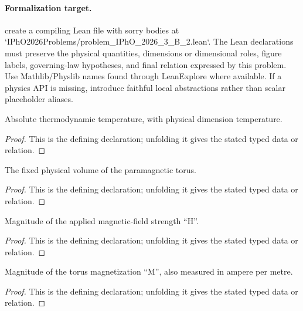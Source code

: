 \paragraph{Formalization target.}
create a compiling Lean file with sorry bodies at `IPhO2026Problems/problem\_IPhO\_2026\_3\_B\_2.lean`. The Lean declarations must preserve the physical quantities, dimensions or dimensional roles, figure labels, governing-law hypotheses, and final relation expressed by this problem.
Use Mathlib/Physlib names found through LeanExplore where available. If a physics API is missing, introduce faithful local abstractions rather than scalar placeholder aliases.

\begin{definition}[ThermodynamicTemperature]
  \label{decl:physics:IPhO_2026_3_B_2:ThermodynamicTemperature}
  Absolute thermodynamic temperature, with physical dimension temperature.
\end{definition}
\begin{proof}
  This is the defining declaration; unfolding it gives the stated typed data or relation.
\end{proof}

\begin{definition}[PhysicalVolume]
  \label{decl:physics:IPhO_2026_3_B_2:PhysicalVolume}
  The fixed physical volume of the paramagnetic torus.
\end{definition}
\begin{proof}
  This is the defining declaration; unfolding it gives the stated typed data or relation.
\end{proof}

\begin{definition}[AppliedFieldStrengthMagnitude]
  \label{decl:physics:IPhO_2026_3_B_2:AppliedFieldStrengthMagnitude}
  Magnitude of the applied magnetic-field strength “H”.
\end{definition}
\begin{proof}
  This is the defining declaration; unfolding it gives the stated typed data or relation.
\end{proof}

\begin{definition}[MagnetizationMagnitude]
  \label{decl:physics:IPhO_2026_3_B_2:MagnetizationMagnitude}
  Magnitude of the torus magnetization “M”, also measured in ampere per metre.
\end{definition}
\begin{proof}
  This is the defining declaration; unfolding it gives the stated typed data or relation.
\end{proof}


